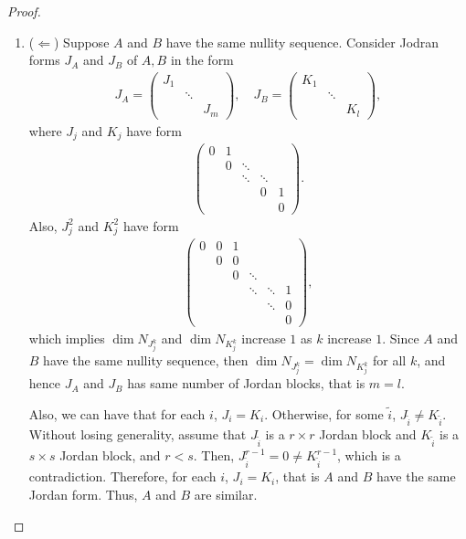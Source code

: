 \documentclass[11pt]{article}
\theoremstyle{definition}
\numberwithin{equation}{subsection}
\begin{document}
\begin{proof}
\begin{enumerate}[label=(\alph*)]
    \item ($\Leftarrow$) Suppose $A$ and $B$ have the same nullity sequence. Consider Jodran forms $J_A$ and $J_B$ of $A, B$ in the form
    \begin{align*}
        J_A = \begin{pmatrix}
            J_1 & & \\
            & \ddots & \\
            & & J_m
        \end{pmatrix}, \quad J_B = \begin{pmatrix}
            K_1 & & \\
            & \ddots & \\
            & & K_l
        \end{pmatrix},
    \end{align*}
    where $J_j$ and $K_j$ have form 
    \begin{align*}
        \begin{pmatrix}
            0 & 1 & & & \\
            & 0 & \ddots & & \\
            & & \ddots & \ddots & \\
            & & & 0 & 1 \\
            & & & & 0
        \end{pmatrix}.
    \end{align*}
    Also, $J_j^2$ and $K_j^2$ have form
    \begin{align*}
        \begin{pmatrix}
            0 & 0 & 1 & & & \\
            & 0 & 0 & & & \\
            & & 0 & \ddots & & \\
            & & & \ddots & \ddots & 1 \\
            & & & & \ddots & 0 \\
            & & & & & 0
        \end{pmatrix},
    \end{align*}
    which implies $\dim N_{J_j^k}$ and $\dim N_{K_j^k}$ increase $1$ as $k$ increase $1$. Since $A$ and $B$ have the same nullity sequence, then $\dim N_{J_j^k} = \dim N_{K_j^k}$ for all $k$, and hence $J_A$ and $J_B$ has same number of Jordan blocks, that is $m = l$. 
    
    Also, we can have that for each $i$, $J_i = K_i$. Otherwise, for some $\tilde{i}$, $J_{\tilde{i}} \neq K_{\tilde{i}}$. Without losing generality, assume that $J_{\tilde{i}}$ is a $r \times r$ Jordan block and $K_{\tilde{i}}$ is a $s \times s$ Jordan block, and $r < s$. Then, $J_{\tilde{i}}^{r-1} = 0 \neq K_{\tilde{i}}^{r-1}$, which is a contradiction. Therefore, for each $i$, $J_i = K_i$, that is $A$ and $B$ have the same Jordan form. Thus, $A$ and $B$ are similar.
\end{enumerate}
\end{proof}
\end{document}
